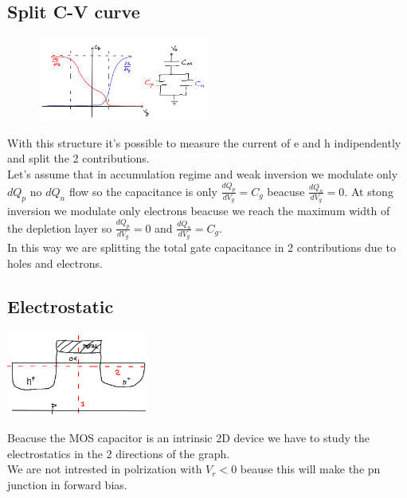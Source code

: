 \subsection{Split C-V curve}
\begin{figure}
\includegraphics[width=0.5\textwidth]{splitcv.png}
\end{figure}
With this structure it's possible to measure the current of e and h indipendently and split the 2 contributions.\\
Let's assume that in accumulation regime and weak inversion we modulate only $dQ_p$ no $dQ_n$ flow so the capacitance is only $\frac{dQ_p}{dV_g}=C_g$ beacuse $\frac{dQ_n}{dV_g}=0$.
At stong inversion we modulate only electrons beacuse we reach the maximum width of the depletion layer so $\frac{dQ_p}{dV_g}=0$ and $\frac{dQ_n}{dV_g}=C_g$.\\ In this way we are splitting the total gate capacitance in 2 contributions due to holes and electrons.\\


\subsection{Electrostatic}
\centering
\includegraphics[width=0.35\textwidth]{sections.png}\\
\raggedright

Beacuse the MOS capacitor is an intrinsic 2D device we have to study the electrostatics in the 2 directions of the graph. \\ 
We are not intrested in polrization with $V_r<0$ beause this will make the pn junction in forward bias.\\



